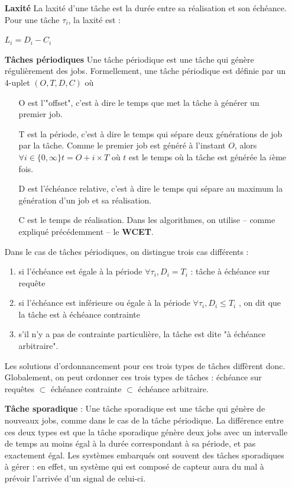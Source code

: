 \documentclass[11pt,a4paper,oneside]{report}
\begin{document}
\begin{itemize}
		\item[\textbf{Laxité}] La laxité d'une tâche est la durée entre sa réalisation et son échéance. 
		Pour une tâche $\tau_i$, la laxité est :
		\begin{center}
			$L_i = D_i - C_i$
		\end{center}
		\vspace{0.5cm}
		\item[\textbf{Tâches périodiques}]
		Une tâche périodique est une tâche qui génère régulièrement des jobs.  
		Formellement, une tâche périodique est définie par un 4-uplet $(O, T, D, C)$ où \medskip
		\begin{itemize}
			\item[O] est l'"offset", c'est à dire le temps que met la tâche à générer un premier job.
			\item[T] est la période, c'est à dire le temps qui sépare deux générations de job par la tâche. 
			Comme le premier job est généré à l'instant $O$, alors $\forall i \in \{0, \infty \} t = O + i\times T$ 
			où $t$ est le temps où la tâche est générée la $i$ème fois.
			\item[D] est l'échéance relative, c'est à dire le temps qui sépare au maximum la génération 
			d'un job et sa réalisation.
			\item[C] est le temps de réalisation. Dans les algorithmes, on utilise -- comme expliqué précédemment -- le \textbf{WCET}.
		\end{itemize}	
		Dans le cas de tâches périodiques, on distingue trois cas différents : \medskip
		\begin{enumerate}
			\item si l'échéance est égale à la période $\forall \tau_i, D_i = T_i$ : tâche à \label{echeancesurrequete}échéance sur requête
			\item si l'échéance est inférieure ou égale à la période $\forall \tau_i, D_i \leq T_i $ , on dit que la tâche est à \label{echeancecontrainte} échéance contrainte
			\item s'il n'y a pas de contrainte particulière, la tâche est dite "à échéance arbitraire".
		\end{enumerate}
		Les solutions d'ordonnancement pour ces trois types de tâches diffèrent donc. 
		Globalement, on peut ordonner ces trois types de tâches : \medskip
		échéance sur requêtes $\subset$ échéance contrainte $\subset$ échéance arbitraire.
		
		\item[\textbf{Tâche sporadique}] : Une tâche sporadique est une tâche qui génère de nouveaux jobs, 
		comme dans le cas de la tâche périodique. 
		La différence entre ces deux types est que la tâche sporadique 
		génère deux jobs avec un intervalle de temps au moins égal à la durée correspondant à sa période, 
		et pas exactement égal. Les systèmes embarqués ont souvent des tâches sporadiques à gérer : 
		en effet, un système qui est composé de capteur aura du mal à prévoir l'arrivée d'un signal de 
		celui-ci. 
		

\end{itemize}
\end{document}

